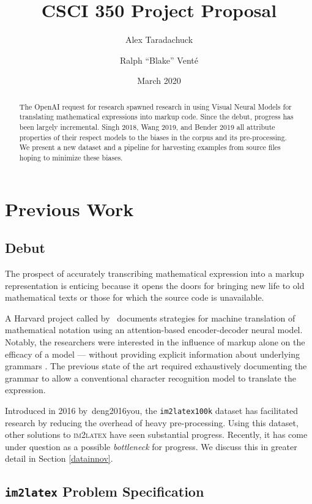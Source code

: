 \documentclass{article}
\title{\TeXNet{} \textbar{} CSCI 350 Project Proposal}
\author{Alex Taradachuck \and Ralph ``Blake'' Vent\'{e}}
\date{March 2020}
\begin{document}
\maketitle

\begin{abstract}
  The OpenAI request for research spawned research in using Visual Neural Models
  for translating mathematical expressions into markup code. Since the debut,
  progress has been largely incremental. Singh 2018, Wang 2019, and Bender 2019
  all attribute properties of their respect models to the biases in the corpus
  and its pre-processing. We present a new dataset and a pipeline for harvesting
  examples from source files hoping to minimize these biases.
\end{abstract}

\section{Previous Work}

\subsection{Debut}

The prospect of accurately transcribing mathematical expression into a markup
representation is enticing because it opens the doors for bringing new life to
old mathematical texts or those for which the source code is unavailable.

A Harvard project called  by~\citeauthor{deng2016you}
documents strategies for machine translation of mathematical notation using an
attention-based encoder-decoder neural model. Notably, the researchers were
interested in the influence of markup alone on the efficacy of a model ---
without providing explicit information about underlying grammars
\parencite[1]{deng2016you}. The previous state of the art required exhaustively
documenting the grammar to allow a conventional character recognition model to
translate the expression.

Introduced in 2016 by~\citeauthor{}{deng2016you}, the \texttt{im2latex100k} dataset has
facilitated research by reducing the overhead of heavy pre-processing. Using
this dataset, other solutions to \textsc{im2latex} have seen substantial
progress. Recently, it has come under question as a possible \textit{bottleneck} for
progress. We discuss this in greater detail in Section \ref{datainnov}.

\cprotect
\subsection{\texttt{im2latex} Problem Specification}
\end{document}
